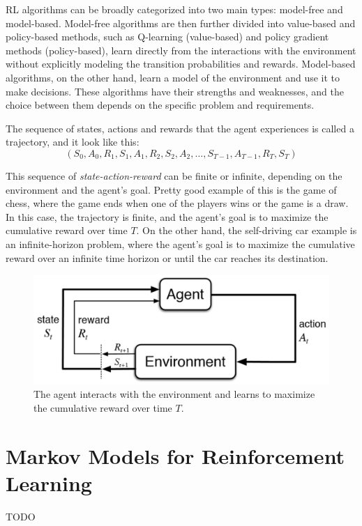 \documentclass[../chapters.tex]{subfiles}
\begin{document}
    RL algorithms can be broadly categorized into two main types: model-free and model-based.
    Model-free algorithms are then further divided into value-based and policy-based methods, such as Q-learning (value-based) and policy gradient methods (policy-based), learn directly from the interactions with the environment without explicitly modeling the transition probabilities and rewards.
    Model-based algorithms, on the other hand, learn a model of the environment and use it to make decisions.
    These algorithms have their strengths and weaknesses, and the choice between them depends on the specific problem and requirements.

    The sequence of states, actions and rewards that the agent experiences is called a trajectory, and it look like this:
    \begin{equation}
    (S_0, A_0, R_1, S_1, A_1, R_2, S_2, A_2, \dots, S_{T-1}, A_{T-1}, R_T, S_T)
    \end{equation}

    This sequence of \emph{state-action-reward} can be finite or infinite, depending on the environment and the agent's goal.
    Pretty good example of this is the game of chess, where the game ends when one of the players wins or the game is a draw.
    In this case, the trajectory is finite, and the agent's goal is to maximize the cumulative reward over time $T$.
    On the other hand, the self-driving car example is an infinite-horizon problem, where the agent's goal is to maximize the cumulative reward over an infinite time horizon or until the car reaches its destination.

    \begin{figure}[h!]
        \includegraphics[width=0.8\linewidth]{image/agent-environment}
        \centering
        \caption{The agent interacts with the environment and learns to maximize the cumulative reward over time $T$.}
        \label{fig:rl-introduction}
    \end{figure}


    \section{Markov Models for Reinforcement Learning}\label{sec:markov-models-for-rl}
    TODO
\end{document}

